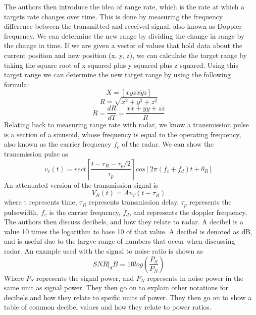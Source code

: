 \documentclass[12pt]{article}
\begin{document}
The authors then introduce the idea of range rate, which is the rate at which a targets rate changes over time. This is done by measuring the frequency difference between the transmitted and received signal, also known as Doppler frequency. We can determine the new range by dividing the change in range by the change in time. If we are given a vector of values that hold data about the current position and new position (x, y, z), we can calculate the target range by taking the square root of x squared plus y squared plus z squared. Using this target range we can determine the new target range by using the following formula:
\begin{equation}
    X = [x y z \dot{x} \dot{y} \dot{z}]
\end{equation}
\begin{equation}
    R = \sqrt{x^2 + y^2 + z^2}
\end{equation}
\begin{equation}
    \dot{R} = \frac{dR}{dT} = \frac{x\dot{x}+y\dot{y}+z\dot{z}}{R}
\end{equation}
Relating back to measuring range rate with radar, we know a transmission pulse is a section of a sinusoid, whose frequency is equal to the operating frequency, also known as the carrier frequency $f_c$ of the radar. We can show the transmission pulse as
\begin{equation}
    v_r (t) = rect \left[ \frac{t - \tau_R - \tau_p / 2}{\tau_p} \right] cos \left[  2 \pi (f_c + f_d)t + \theta_R \right]
\end{equation}
An attenuated version of the transmission signal is
\begin{equation}
    V_R(t) = Av_T(t- \tau_R)
\end{equation}
where t represents time, $\tau_R$ represents transmission delay, $\tau_p$ represents the pulsewidth, $f_c$ is the carrier frequency, $f_d$, and represents the doppler frequency.
The authors then discuss decibels, and how they relate to radar. A decibel is a value 10 times the logarithm to base 10 of that value. A decibel is denoted as dB, and is useful due to the largve range of numbers that occur when discussing radar. An example used with the signal to noise ratio is shown as
\begin{equation}
    SNR|_dB = 10log \left( \frac{P_S}{P_N} \right)
\end{equation}
Where $P_S$ represents the signal power, and $P_N$ represents in noise power in the same unit as signal power. They then go on to explain other notations for decibels and how they relate to speific units of power. They then go on to show a table of common decibel values and how they relate to power ratios.
\end{document}
